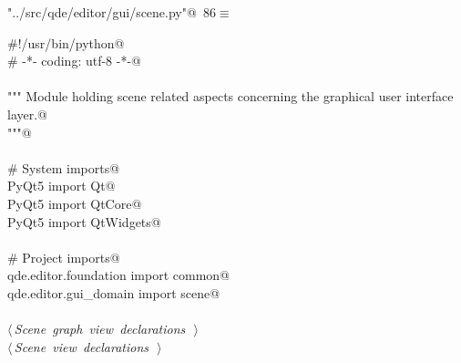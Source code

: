 \documentclass[
    a4paper,      %
    10pt,         %
    openright,    %
    notitlepage,  %
    parskip=half, %
]{scrreprt}       %
\theoremstyle{definition}                    %
\begin{document}
\begin{flushleft} \small
\begin{minipage}{\linewidth}\label{scrap141}\raggedright\small
{} \verb@"../src/qde/editor/gui/scene.py"@\nobreak\ {\footnotesize {86}}$\equiv$
\vspace{-1ex}
\begin{list}{}{} \item
\mbox{}\lstinline@#!/usr/bin/python@\\
\mbox{}\lstinline@# -*- coding: utf-8 -*-@\\
\mbox{}\lstinline@@\\
\mbox{}\lstinline@""" Module holding scene related aspects concerning the graphical user interface layer.@\\
\mbox{}\lstinline@"""@\\
\mbox{}\lstinline@@\\
\mbox{}\lstinline@# System imports@\\
\mbox{}\lstinline@from PyQt5 import Qt@\\
\mbox{}\lstinline@from PyQt5 import QtCore@\\
\mbox{}\lstinline@from PyQt5 import QtWidgets@\\
\mbox{}\lstinline@@\\
\mbox{}\lstinline@# Project imports@\\
\mbox{}\lstinline@from qde.editor.foundation import common@\\
\mbox{}\lstinline@from qde.editor.gui_domain import scene@\\
\mbox{}\lstinline@@\\
\mbox{}\lstinline@@\hbox{$\langle\,${\itshape Scene graph view declarations}\nobreak\ {\footnotesize {}}$\,\rangle$}\lstinline@@\\
\mbox{}\lstinline@@\hbox{$\langle\,${\itshape Scene view declarations}\nobreak\ {\footnotesize {}}$\,\rangle$}\lstinline@@\\
\mbox{}\lstinline@@{\NWsep}
\end{list}
\vspace{-1.5ex}
\footnotesize
\begin{list}{}{\setlength{\itemsep}{-\parsep}\setlength{\itemindent}{-\leftmargin}}

\item{}
\end{list}
\end{minipage}\vspace{4ex}
\end{flushleft}
\end{document}
